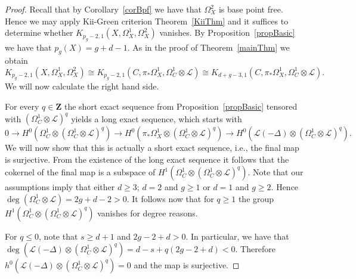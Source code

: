 \documentclass{amsart}
\newcommand{\Z}{\mathbf{Z}}
\newcommand{\cL}{\mathcal{L}}
\theoremstyle{definition}
\theoremstyle{remark}
\begin{document}
\begin{proof}
Recall that by Corollary~\ref{corBpf} we have that $\Omega^2_X$ is base point free. 
Hence we may apply Kii-Green criterion  Theorem~\ref{KiiThm} and it suffices to determine  whether $K_{p_g-2,1}(X,\Omega^1_X,\Omega^2_X)$ vanishes.
By Proposition~\ref{propBasic} we have that $p_g(X)=g+d-1$.
As in the proof of Theorem~\ref{mainThm}  we obtain
 \[ K_{p_g-2,1}(X,\Omega^1_X,\Omega^2_X)\cong   K_{p_g-2,1}(C,\pi_*\Omega^1_X,\Omega^1_C\otimes \cL)\cong K_{d+g-3,1}(C,\pi_*\Omega^1_X,\Omega^1_C\otimes \cL).\]
We will now calculate the right hand side. 


For every $q\in \Z$ the short exact sequence from Proposition~\ref{propBasic} tensored with $(\Omega^1_C\otimes \cL)^q$ yields a long exact sequence, which starts with
\begin{equation}\label{shrtExa} 0\to H^0(\Omega^1_C \otimes (\Omega^1_C\otimes \cL)^q)\to H^0(\pi_*\Omega^1_X \otimes (\Omega^1_C\otimes \cL)^q) \to H^0(\cL(-\Delta)\otimes (\Omega^1_C\otimes \cL)^q).\end{equation}
We will now show that this is actually a short exact sequence, i.e., the final map is surjective.
From the existence of the long exact sequence it follows that the cokernel of the final map is a subspace of $H^1(\Omega^1_C \otimes (\Omega^1_C\otimes \cL)^q)$. 
Note that our assumptions imply that either $d\geq 3$; $d=2$ and $g\geq 1$ or $d=1$ and $g\geq 2$. Hence $\deg(\Omega^1_C\otimes \cL)=2g+d-2>0$. It follows now that for $q\geq 1$ the group $H^1(\Omega^1_C \otimes (\Omega^1_C\otimes \cL)^q)$ vanishes for degree reasons.

For $q\leq 0$, note that $s\geq d+1$ and $2g-2+d>0$. In particular,  we have that $\deg (\cL(-\Delta)\otimes (\Omega^1_C\otimes \cL)^q)= d-s +q(2g-2+d)<0$. Therefore $h^0(\cL(-\Delta)\otimes (\Omega^1_C\otimes \cL)^q)=0$ and the map is surjective.


\end{proof}
\end{document}
